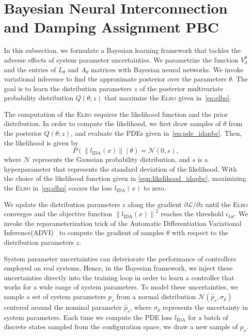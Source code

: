 
\section{Bayesian Neural Interconnection and Damping Assignment PBC}

In this subsection, we formulate a Bayesian learning framework that tackles the
adverse effects of system parameter uncertainties. 
%
We parametrize the function $V_d^\theta$ and the entries of $L_\theta$ and
$A_\theta$ matrices with Bayesian neural networks. 
%
We invoke variational inference to find the approximate posterior over the
parameters $\theta$. The goal is to learn the distribution parameters $z$ of the
posterior multivariate probability distribution $Q(\theta;z)$ that maximize the
\textsc{Elbo} given in~\eqref{eq:elbo}.
%


The computation of the \textsc{Elbo} requires the likelihood function and the
prior distribution.
%
In order to compute the likelihood, we first draw samples of $\theta$ from the
posterior $Q(\theta;z)$, and evaluate the PDEs given in~\eqref{eq:pde_idapbc}.
Then, the likelihood is given by
\begin{equation}
    P( \left\| l_{\textrm{IDA}} (x) \right\| \mid \theta) = \mathcal{N}\left(0, s \right),
    \label{eqn:likelihood_idapbc}
\end{equation}
where $\mathcal{N}$ represents the Gaussian probability distribution, and $s$ is
a hyperparameter that represents the standard deviation of the likelihood.
%
With the choice of the likelihood function given in
\eqref{eqn:likelihood_idapbc}, maximizing the \textsc{Elbo}
in~\eqref{eq:elbo} coaxes the loss $l_{\text{IDA}}(x)$ to zero.


%
We update the distribution parameters $z$ along the gradient $\partial
\mathcal{L}/\partial z$ until the \textsc{Elbo} converges and the objective
function $\left\| l_{\textrm{IDA}} (x) \right\|^2$ reaches the threshold
$\epsilon_{tol}$.
%
We invoke the reparameterization trick of the Automatic Differentiation
Variational Inference(\textsc{ADVI})~\cite{kucukelbir2015automatic} to compute
the gradient of samples $\theta$ with respect to the distribution parameters
$z$.


System parameter uncertainties can deteriorate the performance of controllers
employed on real systems. 
%
Hence, in the Bayesian framework, we inject these uncertainties directly into
the training loop in order to learn a controller that works for a wide range of
system parameters.
%
To model these uncertainties, we sample a set of system parameters $p_s$ from
a normal distribution $\mathcal{N}(\hat{p}_s, \sigma_{p})$ centered around the
nominal parameter $\hat{p}_s$, where $\sigma_{p}$ represents the uncertainty
in system parameters.
%
Each time we compute the PDE loss $l_{\text{IDA}}$ for a batch of discrete
states sampled from the configuration space, we draw a new sample
of $p_s$.



